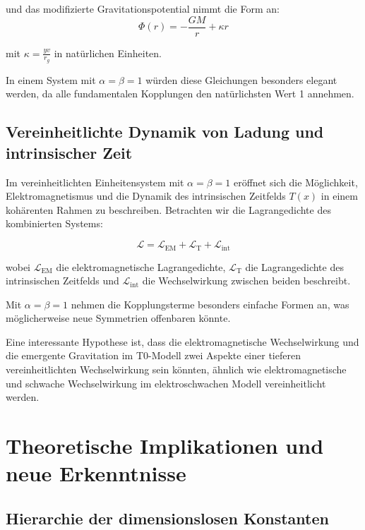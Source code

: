 \documentclass[12pt,a4paper]{article}
\newcommand{\Tfield}{T(x)}
\begin{document}
	und das modifizierte Gravitationspotential nimmt die Form an:
	\begin{equation}
		\Phi(r) = -\frac{G M}{r} + \kappa r
	\end{equation}
	
	mit $\kappa = \frac{y v}{r_g}$ in natürlichen Einheiten.
	
	In einem System mit $\alpha = \beta = 1$ würden diese Gleichungen besonders elegant werden, da alle fundamentalen Kopplungen den natürlichsten Wert 1 annehmen.
	
	\subsection{Vereinheitlichte Dynamik von Ladung und intrinsischer Zeit}
	
	Im vereinheitlichten Einheitensystem mit $\alpha = \beta = 1$ eröffnet sich die Möglichkeit, Elektromagnetismus und die Dynamik des intrinsischen Zeitfelds $\Tfield$ in einem kohärenten Rahmen zu beschreiben. Betrachten wir die Lagrangedichte des kombinierten Systems:
	
	\begin{equation}
		\mathcal{L} = \mathcal{L}_{\text{EM}} + \mathcal{L}_{\text{T}} + \mathcal{L}_{\text{int}}
	\end{equation}
	
	wobei $\mathcal{L}_{\text{EM}}$ die elektromagnetische Lagrangedichte, $\mathcal{L}_{\text{T}}$ die Lagrangedichte des intrinsischen Zeitfelds und $\mathcal{L}_{\text{int}}$ die Wechselwirkung zwischen beiden beschreibt.
	
	Mit $\alpha = \beta = 1$ nehmen die Kopplungsterme besonders einfache Formen an, was möglicherweise neue Symmetrien offenbaren könnte.
	
	Eine interessante Hypothese ist, dass die elektromagnetische Wechselwirkung und die emergente Gravitation im T0-Modell zwei Aspekte einer tieferen vereinheitlichten Wechselwirkung sein könnten, ähnlich wie elektromagnetische und schwache Wechselwirkung im elektroschwachen Modell vereinheitlicht werden.
	
	\section{Theoretische Implikationen und neue Erkenntnisse}
	
	\subsection{Hierarchie der dimensionslosen Konstanten}
	
\end{document}
